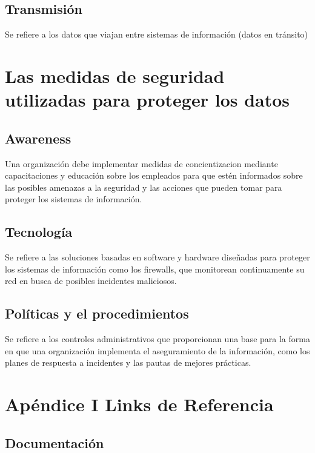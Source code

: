 \documentclass[a4paper]{article} %
\begin{document}
    \subsection{Transmisión}

    Se refiere a los datos que viajan entre sistemas de información (datos en tránsito)

\vspace{2cm}

\section{Las medidas de seguridad utilizadas para proteger los datos} 

    \subsection{Awareness}

    Una organización debe implementar medidas de concientizacion mediante capacitaciones y educación sobre los empleados para que estén informados sobre las posibles amenazas a la seguridad y las acciones que pueden tomar para proteger los sistemas de información.

    \subsection{Tecnología}

    Se refiere a las soluciones basadas en software y hardware diseñadas para proteger los sistemas de información como los firewalls, que monitorean continuamente su red en busca de posibles incidentes maliciosos.

    \subsection{Políticas y el procedimientos}

    Se refiere a los controles administrativos que proporcionan una base para la forma en que una organización implementa el aseguramiento de la información, como los planes de respuesta a incidentes y las pautas de mejores prácticas.

\section{Apéndice I Links de Referencia}
       
    \subsection{Documentación}
\end{document}
